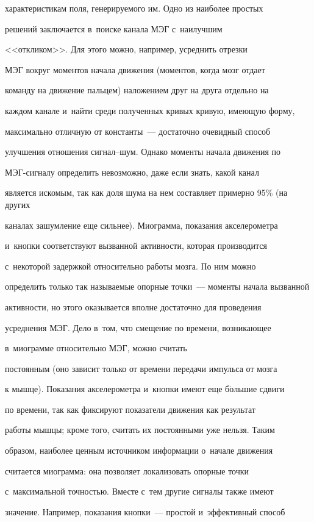 характеристикам поля, генерируемого им. Одно из наиболее простых


решений заключается в~поиске канала МЭГ с~наилучшим


<<откликом>>. Для этого можно, например, усреднить отрезки


МЭГ вокруг моментов начала движения (моментов, когда мозг отдает


команду на движение пальцем) наложением друг на друга отдельно на


каждом канале и~найти среди полученных кривых кривую, имеющую форму,


максимально отличную от константы~--- достаточно очевидный способ


улучшения отношения сиг\-нал--шум. Однако моменты начала движения по


МЭГ-сиг\-на\-лу определить невозможно, даже если знать, какой канал


является искомым, так как доля шума на нем со\-став\-ля\-ет примерно 95\% (на других


каналах зашумление еще сильнее). Миограмма, показания акселерометра


и~кнопки соответствуют вызванной активности, которая производится


с~некоторой задержкой относительно работы мозга. По ним можно


определить только так называемые опорные точки~--- моменты начала вызванной


активности, но этого оказывается вполне достаточно для проведения


усреднения МЭГ. Дело  в~том, что смещение по времени, возникающее


в~миограмме относительно МЭГ, можно считать


постоянным (оно зависит только от времени передачи импульса от мозга


к мышце). Показания акселерометра и~кнопки имеют еще б$\acute{\mbox{о}}$льшие сдвиги


по времени, так как фиксируют показатели движения как результат


работы мышцы; кроме того, считать их постоянными уже нельзя. Таким


образом, наиболее ценным источником информации о~начале движения


считается миограмма: она позволяет локализовать опорные точки


с~максимальной точностью. Вместе с~тем другие сигналы также имеют


значение. Например, показания кнопки~--- простой и~эффективный способ


